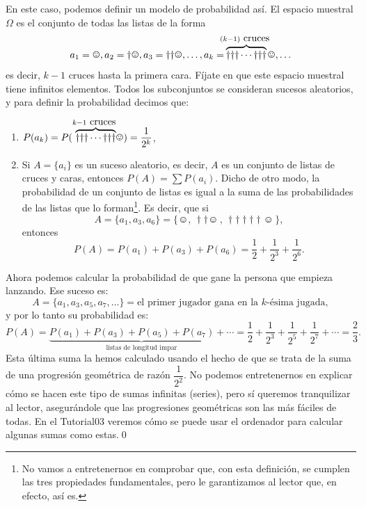 \begin{Ejemplo}
En este caso, podemos definir un modelo de probabilidad así. El espacio muestral $\Omega$ es el conjunto de todas las listas de la forma
\[a_1=\smiley, a_2=\dag\smiley, a_3=\dag \dag\smiley,\ldots,a_k=\hspace{-7pt}\overbrace{\dag \dag \dag \cdots\dag \dag \dag }^{(k-1)\mbox{ cruces }}\hspace{-7pt}\smiley,\ldots\]
es decir, $k-1$ cruces hasta la primera cara. Fíjate en que este espacio muestral tiene infinitos elementos. Todos los subconjuntos se consideran sucesos aleatorios, y para definir la probabilidad decimos que:
\begin{enumerate}
    \item $P(a_k)=P(\overbrace{\dag \dag \dag \cdots\dag \dag \dag }^{k-1\mbox{ cruces }}\hspace{-5pt}\smiley)=\dfrac{1}{2^{k}}$,
    \item Si $A=\{a_i\}$ es un suceso aleatorio, es decir, $A$ es un conjunto de listas de cruces y caras, entonces $P(A)=\sum P(a_i)$. Dicho de otro
modo, la probabilidad de un conjunto de listas es igual a la suma de las probabilidades de las listas que lo forman\footnote{No vamos a entretenernos
en comprobar que, con esta definición, se cumplen las tres propiedades fundamentales, pero le garantizamos al lector que, en efecto, así es.}. Es
decir, que si
        \[A=\{a_1,a_3,a_6\}=\{\smiley,\,\dag \dag\smiley\, ,\, \dag \dag \dag \dag \dag\smiley\,\},\]
        entonces
        \[P(A)=P(a_1)+P(a_3)+P(a_6)=\dfrac{1}{2}+\dfrac{1}{2^3}+\dfrac{1}{2^6}.\]
\end{enumerate}
Ahora podemos calcular la probabilidad de que gane la persona que empieza lanzando. Ese suceso es:
\[A=\{a_1,a_3,a_5,a_7,\ldots\}=\mbox{el primer jugador gana en la $k$-ésima jugada},\]
y por lo tanto su probabilidad es:
\[P(A)=\underbrace{P(a_1)+P(a_3)+P(a_5)+P(a_7)+\cdots}_{\mbox{listas de longitud impar}}=
\dfrac{1}{2}+\dfrac{1}{2^3}+\dfrac{1}{2^5}+\dfrac{1}{2^7}+\cdots=\dfrac{2}{3}.
\]
Esta última suma la hemos calculado usando el hecho de que se trata de la suma de una {\sf progresión geométrica} de razón $\dfrac{1}{2^2}$. No podemos entretenernos en explicar cómo se hacen este tipo de sumas infinitas (series), pero sí queremos tranquilizar al lector, asegurándole que las progresiones geométricas son las más fáciles de todas. En el Tutorial03 veremos cómo se puede usar el ordenador para calcular algunas sumas como estas.\qed
\end{Ejemplo}

